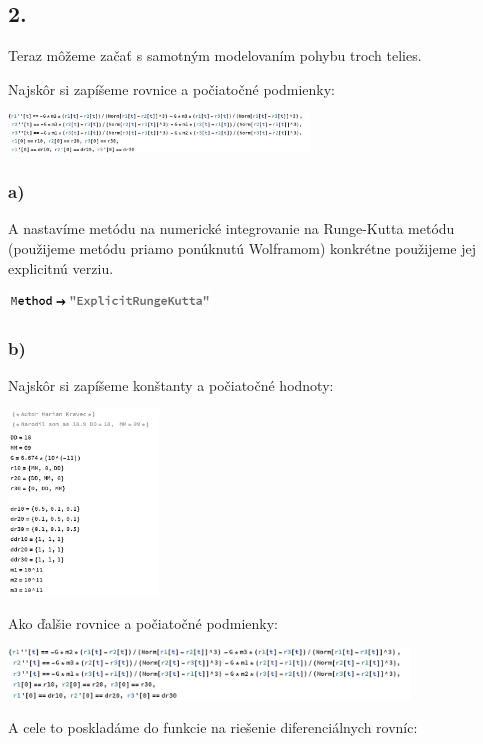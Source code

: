 \documentclass[a4paper]{article}
\begin{document}
	\subsection{2.}
	
	Teraz môžeme začať s samotným modelovaním pohybu troch telies.
	
	Najskôr si zapíšeme rovnice a počiatočné podmienky:
	
	\centerline{\includegraphics[width=0.6\textwidth]{rovnice_2}}
	
	\subsubsection{a)}
	A nastavíme metódu na numerické integrovanie na Runge-Kutta metódu (použijeme metódu priamo ponúknutú Wolframom) konkrétne použijeme jej explicitnú verziu.
	
	\centerline{\includegraphics[width=0.4\textwidth]{method}}
	
	\subsubsection{b)}
	Najskôr si zapíšeme konštanty a počiatočné hodnoty:
	
	\centerline{\includegraphics[width=0.3\textwidth]{hodnoty}}
	
	Ako ďalšie rovnice a počiatočné podmienky:
	
	\centerline{\includegraphics[width=0.8\textwidth]{rovnice_2}}
	
	A cele to poskladáme do funkcie na riešenie diferenciálnych rovníc:
	
\end{document}
